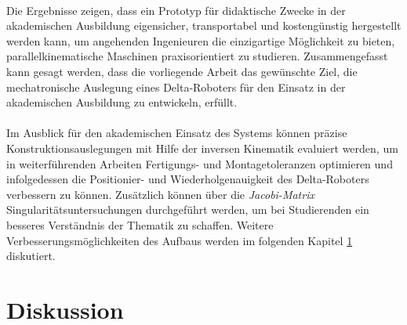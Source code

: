 \documentclass[Bachelor, BMR, ngerman]{twbook}
\begin{document}
    \\
    Die Ergebnisse zeigen, dass ein Prototyp für didaktische Zwecke in der akademischen Ausbildung eigensicher, transportabel und kostengünstig hergestellt werden kann, um angehenden Ingenieuren die einzigartige Möglichkeit zu bieten, parallelkinematische Maschinen praxisorientiert zu studieren. Zusammengefasst kann gesagt werden, dass die vorliegende Arbeit das gewünschte Ziel, die mechatronische Auslegung eines Delta-Roboters für den Einsatz in der akademischen Ausbildung zu entwickeln, erfüllt.\\
    \\
    Im Ausblick für den akademischen Einsatz des Systems können präzise Konstruktionsauslegungen mit Hilfe der inversen Kinematik evaluiert werden, um in weiterführenden Arbeiten Fertigungs- und Montagetoleranzen optimieren und infolgedessen die Positionier- und Wiederholgenauigkeit des Delta-Roboters verbessern zu können. Zusätzlich können über die \textit{Jacobi-Matrix} Singularitätsuntersuchungen durchgeführt werden, um bei Studierenden ein besseres Verständnis der Thematik zu schaffen. Weitere Verbesserungsmöglichkeiten des Aufbaus werden im folgenden Kapitel \ref{cap:diskussion} diskutiert.


\chapter{Diskussion}
\label{cap:diskussion}
\end{document}
